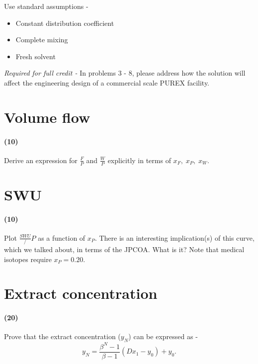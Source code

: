 \documentclass[11pt,a4paper]{article}
\begin{document}
\noindent Use standard assumptions -
\begin{itemize}[leftmargin=*,topsep=0pt,font=\bfseries]
    \item Constant distribution coefficient
    \item Complete mixing
    \item Fresh solvent
\end{itemize}

\vspace{\baselineskip}

\noindent\textit{Required for full credit - } In problems 3 - 8, please address how the solution will affect the engineering design of a commercial scale PUREX facility. 

\newpage

\section{Volume flow}
\paragraph*{(10)}
Derive an expression for $\frac{F}{P}$ and $\frac{W}{P}$ explicitly in terms of $x_F, \; x_P, \; x_W$.





\newpage

\section{SWU}
\paragraph*{(10)}
Plot $\frac{SWU}/{P}$ as a function of $x_P$. There is an interesting implication(s) of this curve, which we talked about, in terms of the JPCOA. What is it? Note that medical isotopes require $x_P = 0.20$.





\newpage

\section{Extract concentration}
\paragraph*{(20)}
Prove that the extract concentration ($y_N$) can be expressed as -
\begin{equation}
    y_N = \frac{\beta^N - 1}{\beta - 1}(Dx_1 - y_0)+ y_0.
\end{equation}
\end{document}
